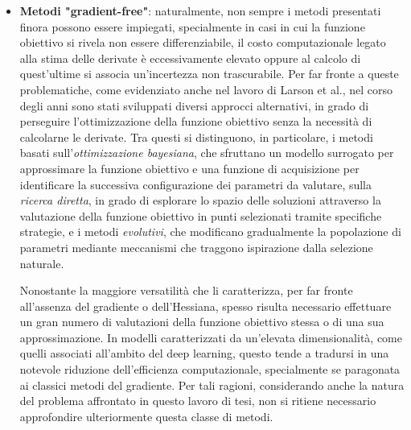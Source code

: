 \begin{itemize}
            \begin{equation}
                \theta_{\text{t+1}} = \theta_{t} - H_{L}(\theta_{t})^{-1} \cdot \nabla_{\theta} L (\theta_{t})
                \label{eq:Newton}
            \end{equation}

        Nonostante gli indubbi vantaggi in termini prestazionali, la natura matriciale di un metodo analogo comporta un notevole incremento del costo computazionale, in particolare per modelli di deep learning. Quest'ultimi, infatti, possono presentare un elevato numero di parametri, rendendo eccessivamente onerosi il calcolo, la memorizzazione e l'inversione dell'intera matrice Hessiana ad ogni passo di aggiornamento. Per limitare tali problematiche sono stati sviluppati metodi che ricorrono una approssimazione dell'Hessiana. L'analisi di quest'ultimi, tuttavia, va oltre gli scopi di questo lavoro di tesi e, pertanto, si sceglie di non approfondire oltre questa classe di metodi. 
        
        \item \textbf{Metodi "gradient-free"}: naturalmente, non sempre i metodi presentati finora possono essere impiegati, specialmente in casi in cui la funzione obiettivo si rivela non essere differenziabile, il costo computazionale legato alla stima delle derivate è eccessivamente elevato oppure al calcolo di quest'ultime si associa un'incertezza non trascurabile. Per far fronte a queste problematiche, come evidenziato anche nel lavoro di Larson et al.\cite{Larson_DF}, nel corso degli anni sono stati sviluppati diversi approcci alternativi, in grado di perseguire l'ottimizzazione della funzione obiettivo senza la necessità di calcolarne le derivate. Tra questi si distinguono, in particolare, i metodi basati sull'\emph{ottimizzazione bayesiana}, che sfruttano un modello surrogato per approssimare la funzione obiettivo e una funzione di acquisizione per identificare la successiva configurazione dei parametri da valutare, sulla \emph{ricerca diretta}, in grado di esplorare lo spazio delle soluzioni attraverso la valutazione della funzione obiettivo in punti selezionati tramite specifiche strategie, e i metodi \emph{evolutivi}, che modificano gradualmente la popolazione di parametri mediante meccanismi che traggono ispirazione dalla selezione naturale. 
        
        Nonostante la maggiore versatilità che li caratterizza, per far fronte all'assenza del gradiente o dell'Hessiana, spesso risulta necessario effettuare un gran numero di valutazioni della funzione obiettivo stessa o di una sua approssimazione. In modelli caratterizzati da un'elevata dimensionalità, come quelli associati all'ambito del deep learning, questo tende a tradursi in una notevole riduzione dell'efficienza computazionale, specialmente se paragonata ai classici metodi del gradiente. Per tali ragioni, considerando anche la natura del problema affrontato in questo lavoro di tesi, non si ritiene necessario approfondire ulteriormente questa classe di metodi.
        
    \end{itemize}
 

